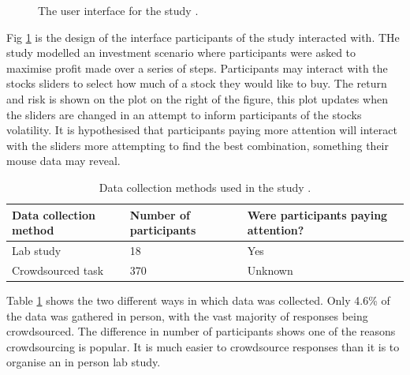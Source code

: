 \documentclass{article}
\begin{document}
\begin{figure}[ht]
    \centering
    \centerline{
    }
    \caption{The user interface for the study \cite{tom2018risk}.}
    \label{fig:interface}
\end{figure}

Fig \ref{fig:interface} is the design of the interface participants of the study interacted with.
THe study modelled an investment scenario where participants were asked to maximise profit made over a series of steps.
Participants may interact with the stocks sliders to select how much of a stock they would like to buy.
The return and risk is shown on the plot on the right of the figure, this plot updates when the sliders are changed in an attempt to inform participants of the stocks volatility.
It is hypothesised that participants paying more attention will interact with the sliders more attempting to find the best combination, something their mouse data may reveal.

\begin{table}[ht]
    \caption{\label{table:studies} Data collection methods used in the study \cite{tom2018risk}.}
    \small
    \begin{tabular}{lll}
        \hline
        Data collection method & Number of participants & Were participants paying attention? \\    \hline
        Lab study              & 18                     & Yes                                 \\
        Crowdsourced task      & 370                    & Unknown                             \\    \hline
    \end{tabular}
\end{table}

Table \ref{table:studies} shows the two different ways in which data was collected.
Only 4.6\% of the data was gathered in person, with the vast majority of responses being crowdsourced.
The difference in number of participants shows one of the reasons crowdsourcing is popular. 
It is much easier to crowdsource responses than it is to organise an in person lab study.
\end{document}
